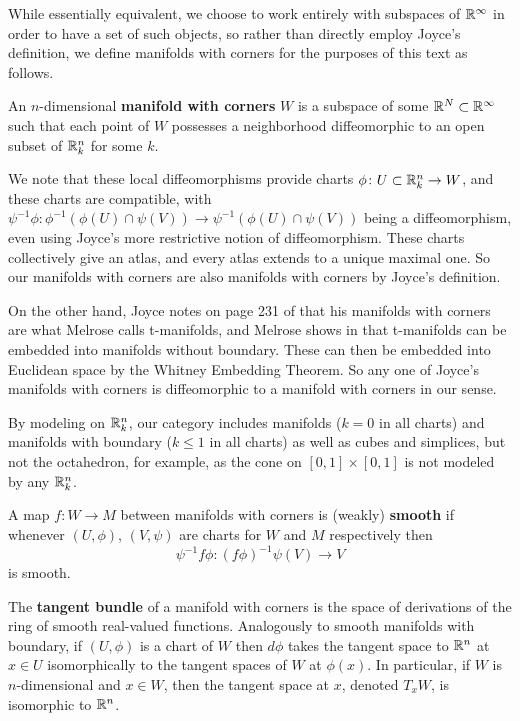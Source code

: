 While essentially equivalent, we choose to work entirely with subspaces of $\mathbb{R}^\infty$ in order to have a set of such objects, so rather than directly employ Joyce's definition, we define manifolds with corners for the purposes of this text as follows.

\begin{definition}\label{D: MWC}
	An $n$-dimensional \textbf{manifold with corners} $W$ is a subspace of some $\mathbb{R}^N \subset \mathbb{R}^\infty$ such that each point of $W$ possesses a neighborhood diffeomorphic to an open subset of $\mathbb{R}^n_k$ for some $k$.
\end{definition}

We note that these local diffeomorphisms provide charts $\phi \colon U \subset \mathbb{R}^n_k \to W$, and these charts are compatible, with $\psi^{-1}\phi \colon \phi^{-1}(\phi(U) \cap \psi(V)) \to \psi^{-1}(\phi(U) \cap \psi(V))$ being a diffeomorphism, even using Joyce's more restrictive notion of diffeomorphism.
These charts collectively give an atlas, and every atlas extends to a unique maximal one.
So our manifolds with corners are also manifolds with corners by Joyce's definition.

On the other hand, Joyce notes on page 231 of \cite{Joy12} that his manifolds with corners are what Melrose calls t-manifolds, and Melrose shows in \cite[Proposition 1.15.1]{Melrose} that t-manifolds can be embedded into manifolds without boundary.
These can then be embedded into Euclidean space by the Whitney Embedding Theorem.
So any one of Joyce's manifolds with corners is diffeomorphic to a manifold with corners in our sense.

By modeling on $\mathbb{R}^n_k$, our category includes manifolds ($k = 0$ in all charts) and manifolds with boundary ($k \leq 1$ in all charts) as well as cubes and simplices, but not the octahedron, for example, as the cone on $[0,1] \times [0,1]$ is not modeled by any $\mathbb{R}^n_k$.

\begin{comment}
	The smooth real-valued functions on a manifold with corners $W$ are those $f$ such that for each chart $\phi \colon U \subset \R^n_k \to W$ the composition $f \circ \phi \colon U \to \R$ is smooth.
\end{comment}

\begin{definition}
	A map $f \colon W \to M$ between manifolds with corners is {(weakly) \bf smooth} if whenever $(U,\phi)$, $(V,\psi)$ are charts for $W$ and $M$ respectively then
	$$\psi^{-1}f \phi \colon (f\phi)^{-1}\psi(V) \to V$$
	is smooth.

	The \textbf{tangent bundle} of a manifold with corners is the space of derivations of the ring of smooth real-valued functions.
	Analogously to smooth manifolds with boundary, if $(U,\phi)$ is a chart of $W$ then $d\phi$ takes the tangent space to $\mathbb{R}^n$ at $x \in U$ isomorphically to the tangent spaces of $W$ at $\phi(x)$.
	In particular, if $W$ is $n$-dimensional and $x \in W$, then the tangent space at $x$, denoted $T_xW$, is isomorphic to $\mathbb{R}^n$.
\end{definition}

